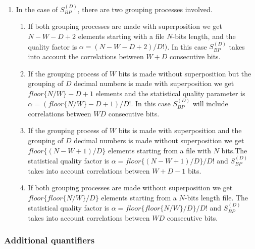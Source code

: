 \begin{enumerate}
\item In the case of $S^{(D)}_{BP}$, there are two grouping processes involved. 
\begin{enumerate}
\item If both grouping processes are made with superposition we get $N-W-D+2$ elements starting with a file $N$-bits length, and the quality factor is $\alpha=(N-W-D+2)/D!)$. In this case $S^{(D)}_{BP}$ takes into account the correlations between $W+D$ consecutive bits. 
\item If the grouping process of $W$ bits is made without superposition but the grouping of $D$ decimal numbers is made with superposition we get $floor\{N/W\}-D+1$ elements and the statistical quality parameter is $\alpha=(floor\{N/W\}-D+1)/D!$. In this case $S^{(D)}_{BP}$ will include correlations between $WD$ consecutive bits. 
\item If the grouping process of $W$ bits is made with superposition and the grouping of $D$ decimal numbers is made without superposition we get $floor\{(N-W+1)/D\}$ elements starting from a file with $N$ bits.The statistical quality factor is $\alpha=floor\{(N-W+1)/D\}/D!$ and $S^{(D)}_{BP}$ takes into account correlations between $W+D-1$ bits.
\item If both grouping processes are made without superposition we get $floor\{floor\{N/W\}/D\}$ elements starting from a $N$-bits length file. The statistical quality factor is $\alpha=floor\{floor\{N/W\}/D\}/D!$ and $S^{(D)}_{BP}$ takes into account correlations between $WD$ consecutive bits.
\end{enumerate}
\end{enumerate} 

\subsubsection{Additional quantifiers}
\label{subsec:addquanti}

